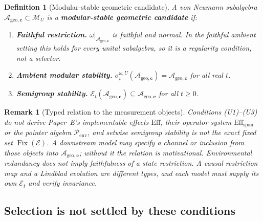 \documentclass[12pt,a4paper]{article}
\newtheorem{definition}[theorem]{Definition}
\newtheorem{remark}[theorem]{Remark}
\begin{document}
\begin{definition}[Modular-stable geometric candidate]
\label{def:modular-accessible}
A von Neumann subalgebra $\mathcal{A}_{\mathrm{geo},\mathbf{c}}\subset\mathcal M_U$ is a \textbf{modular-stable geometric candidate} if:
\begin{enumerate}
\item[\textup{(U1)}] \textbf{Faithful restriction.} $\omega|_{\mathcal{A}_{\mathrm{geo},\mathbf{c}}}$ is faithful and normal. In the faithful ambient setting this holds for every unital subalgebra, so it is a regularity condition, not a selector.
\item[\textup{(U2)}] \textbf{Ambient modular stability.} $\sigma_t^{\omega,U}(\mathcal{A}_{\mathrm{geo},\mathbf{c}})=\mathcal{A}_{\mathrm{geo},\mathbf{c}}$ for all real $t$.
\item[\textup{(U3)}] \textbf{Semigroup stability.} $\mathcal E_t(\mathcal{A}_{\mathrm{geo},\mathbf{c}})\subseteq\mathcal{A}_{\mathrm{geo},\mathbf{c}}$ for all $t\ge0$.
\end{enumerate}
\end{definition}

\begin{remark}[Typed relation to the measurement objects]
\label{rem:translation}
Conditions (U1)--(U3) do not derive Paper~E's implementable effects $\mathrm{Eff}$, their operator system $\mathrm{Eff}_{\mathrm{span}}$ or the pointer algebra $\mathcal P_{\mathrm{env}}$, and setwise semigroup stability is not the exact fixed set $\operatorname{Fix}(\mathcal E)$. A downstream model may specify a channel or inclusion from those objects into $\mathcal{A}_{\mathrm{geo},\mathbf{c}}$; without it the relation is motivational. Environmental redundancy does not imply faithfulness of a state restriction. A causal restriction map and a Lindblad evolution are different types, and each model must supply its own $\mathcal E_t$ and verify invariance.
\end{remark}

\subsection{Selection is not settled by these conditions}
\label{sec:modular-uniqueness}
\end{document}
